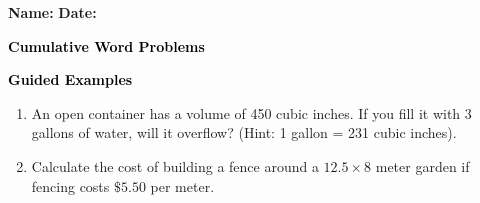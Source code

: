 \documentclass[12pt, letterpaper, fleqn]{article}
\begin{document}
\textbf{Name:} \underline{\hspace{5cm}}
\hfill
\textbf{Date:} \underline{\hspace{3cm}}\\

\begin{tcolorbox}[colback=customteal!20]
    \large\textcolor{black}{\textbf{Cumulative Word Problems}}
\end{tcolorbox}
\newpage
\begin{tcolorbox}[colback=customteal!20]
    \large\textcolor{black}{\textbf{Guided Examples}}
\end{tcolorbox}
\begin{enumerate}[itemsep=3.5cm, leftmargin=0.6cm]
\item An open container has a volume of 450 cubic inches. If you fill it with 3 gallons of water, will it overflow? (Hint: 1 gallon = 231 cubic inches).
\vspace{3cm}
\item Calculate the cost of building a fence around a $12.5 \times 8$ meter garden if fencing costs $\$5.50$ per meter.
\end{enumerate}
\end{document}
